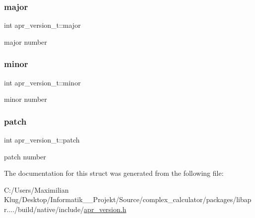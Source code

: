 \subsubsection{\texorpdfstring{major}{major}}
{\footnotesize\ttfamily int apr\+\_\+version\+\_\+t\+::major}

major number \mbox{\label{structapr__version__t_aab0a1e8362517416389631bceeeedbad}} 
\subsubsection{\texorpdfstring{minor}{minor}}
{\footnotesize\ttfamily int apr\+\_\+version\+\_\+t\+::minor}

minor number \mbox{\label{structapr__version__t_a98a629a88e776642d6e527d7535e0791}} 
\subsubsection{\texorpdfstring{patch}{patch}}
{\footnotesize\ttfamily int apr\+\_\+version\+\_\+t\+::patch}

patch number 

The documentation for this struct was generated from the following file\+:\begin{DoxyCompactItemize}
\item 
C\+:/\+Users/\+Maximilian Klug/\+Desktop/\+Informatik\+\_\+\_\+\+Projekt/\+Source/complex\+\_\+calculator/packages/libapr..../build/native/include/\mbox{\hyperlink{apr__version_8h}{apr\+\_\+version.\+h}}\end{DoxyCompactItemize}
